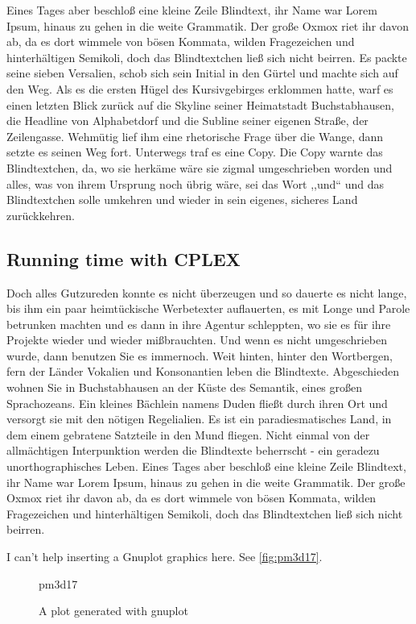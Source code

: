 \documentclass[12pt,a4paper,twoside]{scrartcl}
\numberwithin{equation}{section}
\begin{document}
Eines Tages aber beschloß eine kleine Zeile Blindtext, ihr Name war Lorem Ipsum, hinaus zu gehen in die weite Grammatik. Der große Oxmox riet ihr davon ab, da es dort wimmele von bösen Kommata, wilden Fragezeichen und hinterhältigen Semikoli, doch das Blindtextchen ließ sich nicht beirren. Es packte seine sieben Versalien, schob sich sein Initial in den Gürtel und machte sich auf den Weg. Als es die ersten Hügel des Kursivgebirges erklommen hatte, warf es einen letzten Blick zurück auf die Skyline seiner Heimatstadt Buchstabhausen, die Headline von Alphabetdorf und die Subline seiner eigenen Straße, der Zeilengasse. Wehmütig lief ihm eine rhetorische Frage über die Wange, dann setzte es seinen Weg fort. Unterwegs traf es eine Copy. Die Copy warnte das Blindtextchen, da, wo sie herkäme wäre sie zigmal umgeschrieben worden und alles, was von ihrem Ursprung noch übrig wäre, sei das Wort ,,und`` und das Blindtextchen solle umkehren und wieder in sein eigenes, sicheres Land zurückkehren.

\subsection{Running time with CPLEX}

Doch alles Gutzureden konnte es nicht überzeugen und so dauerte es nicht lange, bis ihm ein paar heimtückische Werbetexter auflauerten, es mit Longe und Parole betrunken machten und es dann in ihre Agentur schleppten, wo sie es für ihre Projekte wieder und wieder mißbrauchten. Und wenn es nicht umgeschrieben wurde, dann benutzen Sie es immernoch. Weit hinten, hinter den Wortbergen, fern der Länder Vokalien und Konsonantien leben die Blindtexte. Abgeschieden wohnen Sie in Buchstabhausen an der Küste des Semantik, eines großen Sprachozeans. Ein kleines Bächlein namens Duden fließt durch ihren Ort und versorgt sie mit den nötigen Regelialien. Es ist ein paradiesmatisches Land, in dem einem gebratene Satzteile in den Mund fliegen. Nicht einmal von der allmächtigen Interpunktion werden die Blindtexte beherrscht - ein geradezu unorthographisches Leben. Eines Tages aber beschloß eine kleine Zeile Blindtext, ihr Name war Lorem Ipsum, hinaus zu gehen in die weite Grammatik. Der große Oxmox riet ihr davon ab, da es dort wimmele von bösen Kommata, wilden Fragezeichen und hinterhältigen Semikoli, doch das Blindtextchen ließ sich nicht beirren.

I can't help inserting a Gnuplot graphics here. See \autoref{fig:pm3d17}.

\begin{figure}
\centering
{pm3d17}
\caption{A plot generated with gnuplot}
\label{fig:pm3d17}
\end{figure}
\end{document}
